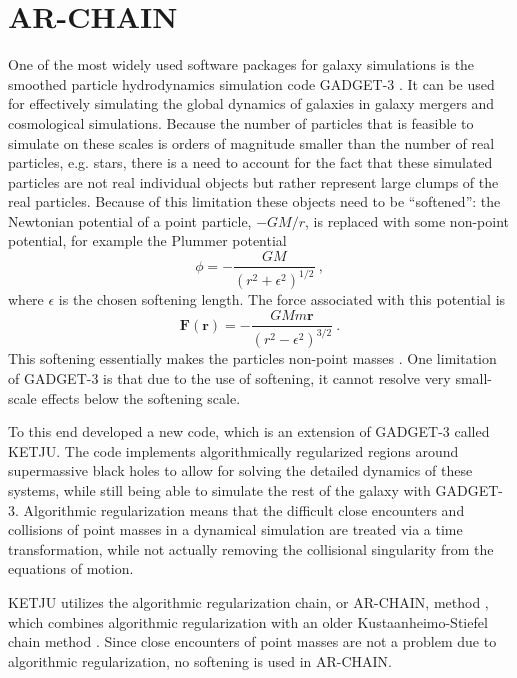 \documentclass[english, oneside]{HYgradu}
\begin{document}
\chapter{AR-CHAIN} \label{chap:ar-chain}

One of the most widely used software packages for galaxy simulations is the smoothed particle hydrodynamics simulation code GADGET-3 \citep{springel:2005}. It can be used for effectively simulating the global dynamics of galaxies in galaxy mergers and cosmological simulations. Because the number of particles that is feasible to simulate on these scales is orders of magnitude smaller than the number of real particles, e.g. stars, there is a need to account for the fact that these simulated particles are not real individual objects but rather represent large clumps of the real particles. Because of this limitation these objects need to be ``softened'': the Newtonian potential of a point particle, $-GM/r$, is replaced with some non-point potential, for example the Plummer potential
\begin{equation}
\phi = -\frac{GM}{(r^2 + \epsilon^2)^{1/2}} \ ,
\end{equation}
where $\epsilon$ is the chosen softening length. The force associated with this potential is
\begin{equation}
\mathbf{F(r)} = -\frac{GMm \mathbf{r}}{(r^2 - \epsilon^2)^{3/2}} \ .
\end{equation}
This softening essentially makes the particles non-point masses \citep{zhang:2019}. One limitation of GADGET-3 is that due to the use of softening, it cannot resolve very small-scale effects below the softening scale.

To this end \cite{rantala:2017} developed a new code, which is an extension of GADGET-3 called KETJU. The code implements algorithmically regularized regions around supermassive black holes to allow for solving the detailed dynamics of these systems, while still being able to simulate the rest of the galaxy with GADGET-3. Algorithmic regularization means that the difficult close encounters and collisions of point masses in a dynamical simulation are treated via a time transformation, while not actually removing the collisional singularity from the equations of motion.

KETJU utilizes the algorithmic regularization chain, or AR-CHAIN, method \citep{mikkola:2002, mikkola:2006,mikkola:2008b}, which combines algorithmic regularization with an older Kustaanheimo-Stiefel chain method \citep{mikkola:1993}. Since close encounters of point masses are not a problem due to algorithmic regularization, no softening is used in AR-CHAIN.
\end{document}
